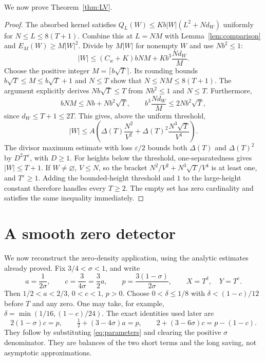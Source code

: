 \documentclass[11pt,a4paper]{article}
\numberwithin{equation}{section}
\theoremstyle{definition}
\begin{document}
\par\noindent We now prove Theorem~\ref{thm:LV}.
\begin{proof}
The absorbed kernel satisfies
$Q_L(W)\le Kb|W|(L^2+Nd_W)$ uniformly for $N\le L\le8(T+1)$.
Combine this at $L=NM$ with Lemma~\ref{lem:comparison} and
$E_M(W)\ge M|W|^2$. Divide by $M|W|$ for nonempty $W$ and use $Nb^2\le1$:
\[
 |W|\le(C_w+K)bNM+Kb^3\frac{Nd_W}{M}.
\]
Choose the positive integer $M=\lceil b\sqrt T\rceil$. Its rounding bounds
$b\sqrt T\le M\le b\sqrt T+1$ and $N\le T$ show that
$N\le NM\le8(T+1)$. The argument explicitly derives
$Nb\sqrt T\le T$ from $Nb^2\le1$ and $N\le T$. Furthermore,
\[
 bNM\le Nb+Nb^2\sqrt T,
 \qquad b^3\frac{Nd_W}{M}\le2Nb^2\sqrt T,
\]
since $d_W\le T+1\le2T$. This gives, above the uniform threshold,
\[
 |W|\le A\left(\Delta(T)\frac{N^2}{V^2}
                   +\Delta(T)^2\frac{N^3\sqrt T}{V^4}\right).
\]
The divisor maximum estimate with loss $\varepsilon/2$ bounds both
$\Delta(T)$ and $\Delta(T)^2$ by $D^2T^\varepsilon$, with $D\ge1$.
For heights below the threshold, one-separatedness gives $|W|\le T+1$.
If $W\ne\varnothing$, $V\le N$, so the bracket
$N^2/V^2+N^3\sqrt T/V^4$ is at least one, and $T^\varepsilon\ge1$.
Adding the bounded-height threshold and $1$ to the large-height constant
therefore handles every $T\ge2$. The empty set has zero cardinality and
satisfies the same inequality immediately.
\end{proof}


\section{A smooth zero detector}
\label{sec:detector}
We now reconstruct the zero-density application, using the analytic estimates
already proved. Fix $3/4<\sigma<1$, and write
\begin{equation}\label{eq:parameters}
 a=\frac1{2\sigma},\qquad c=\frac3{4\sigma}=\frac32a,\qquad
 p=\frac{3(1-\sigma)}{2\sigma},\qquad X=T^\delta,\quad Y=T^c.
\end{equation}
Then $1/2<a<2/3$, $0<c<1$, $p>0$. Choose
$0<\delta\le1/8$ with $\delta<(1-c)/12$ before $T$ and any zero.
One may take, for example,
$\delta=\min(1/16,(1-c)/24)$.
The exact identities used later are
\begin{equation}\label{eq:exponentidentities}
 2(1-\sigma)c=p,\qquad\tfrac12+(3-4\sigma)a=p,\qquad
 2+(3-6\sigma)c=p-(1-c).
\end{equation}
They follow by substituting \eqref{eq:parameters} and clearing the positive
$\sigma$ denominator. They are balances of the two short terms and the long
saving, not asymptotic approximations.
\end{document}

